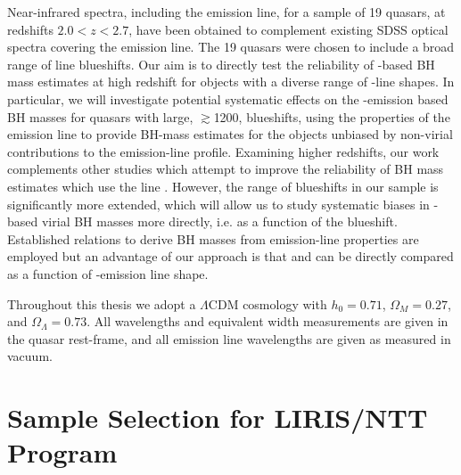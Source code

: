 Near-infrared spectra, including the \ha emission line, for a sample of 19 quasars, at redshifts $2.0 < z < 2.7$, have been obtained to complement existing SDSS optical spectra covering the  emission line. 
The 19 quasars were chosen to include a broad range of  line blueshifts.
Our aim is to directly test the reliability of -based BH mass estimates at high redshift for objects with a diverse range of -line shapes.  
In particular, we will investigate potential systematic effects on the -emission based BH masses for quasars with large, $\gtrsim$1200\kms,  blueshifts, using the properties of the \ha emission line to provide BH-mass estimates for the objects unbiased by non-virial contributions to the emission-line profile.
Examining higher redshifts, our work complements other studies which attempt to improve the reliability of BH mass estimates which use the  line \citep[e.g.][]{runnoe13,denney12}. 
However, the range of  blueshifts in our sample is significantly more extended, which will allow us to study systematic biases in -based virial BH masses more directly, i.e. as a function of the  blueshift. 
Established relations to derive BH masses from emission-line properties are employed but an advantage of our approach is that  and \ha can be directly compared as a function of -emission line shape.  

Throughout this thesis we adopt a $\Lambda$CDM cosmology with $h_0=0.71$, $\Omega_M=0.27$, and $\Omega_\Lambda=0.73$. 
All wavelengths and equivalent width measurements are given in the quasar rest-frame, and all emission line wavelengths are given as measured in vacuum.

\section{Sample Selection for LIRIS/NTT Program}

